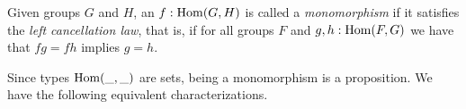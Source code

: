 


\begin{definition}\label{def:monomorphism}
Given groups $G$ and $H$, an $f: \mathrm{Hom}(G,H)$ is called a 
\emph{monomorphism} if it satisfies the \emph{left cancellation law}, 
that is, if for all groups $F$ and $g,h:\mathrm{Hom}(F,G)$ we have that $fg=fh$ implies $g=h$.
\end{definition}

Since types $\mathrm{Hom}(\_,\_)$ are sets, being a monomorphism is a proposition.
We have the following equivalent characterizations.

